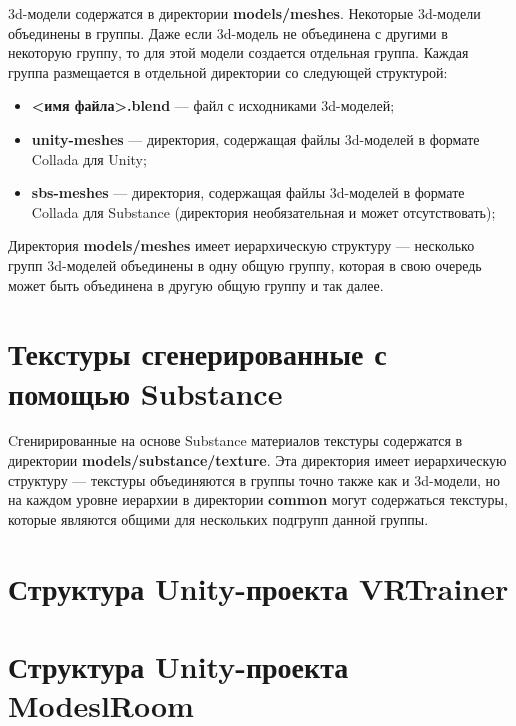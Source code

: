 3d-модели содержатся в директории \textbf{models/meshes}. Некоторые 3d-модели объединены в группы. Даже если 3d-модель не объединена с другими в некоторую группу, то для этой модели создается отдельная группа. Каждая группа размещается в отдельной директории со следующей структурой: 


\begin{itemize}
	\item \textbf{<имя файла>.blend} --- файл с исходниками 3d-моделей;
	\item \textbf{unity-meshes} --- директория, содержащая файлы 3d-моделей в формате Collada для Unity;
	\item \textbf{sbs-meshes} --- директория, содержащая файлы 3d-моделей в формате Collada для Substance (директория необязательная и может отсутствовать);
\end{itemize}

Директория \textbf{models/meshes} имеет иерархическую структуру --- несколько групп 3d-моделей объединены в одну общую группу, которая в свою очередь может быть объединена в другую общую группу и так далее. 

\section{Текстуры сгенерированные с помощью Substance}

Cгенирированные на основе Substance материалов текстуры содержатся в директории \textbf{models/substance/texture}. Эта директория имеет иерархическую структуру --- текстуры объединяются в группы точно также как и 3d-модели, но на каждом уровне иерархии в директории \textbf{common} могут содержаться текстуры, которые являются общими для нескольких подгрупп данной группы.




\section{Структура Unity-проекта VRTrainer}

\section{Структура Unity-проекта ModeslRoom}






